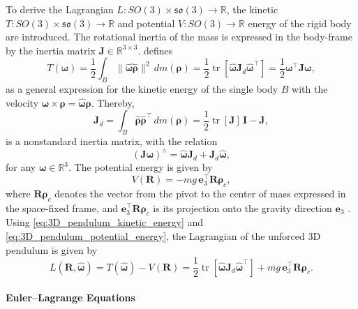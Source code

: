 To derive the Lagrangian $L:SO(3) \times\mathfrak{so}(3) \to \mathbb{R}$, the kinetic $T:SO(3) \times\mathfrak{so}(3) \to \mathbb{R} $ and potential $V:SO(3) \to \mathbb{R}$ energy of the rigid body are introduced. The rotational inertia of the mass is expressed in the body-frame by the inertia matrix $\bm{J} \in \mathbb{R}^{3 \times 3}$. \cite{Lee2008} defines 
\begin{equation}\label{eq:3D_pendulum_kinetic_energy}
T(\bm{\omega}) = \frac{1}{2} \int_{B} \lVert \hat{\bm{\omega} \bm{\rho}} \rVert^{2} \, dm(\bm{\rho})
= \frac{1}{2}\operatorname{tr}[\hat{\bm{\omega}} \bm{J}_d \hat{\bm{\omega}}^\top]
= \frac{1}{2} \bm{\omega}^\top \bm{J} \bm{\omega},
\end{equation}
as a general expression for the kinetic energy of the single body $B$ with the velocity $\bm{\omega} \times \bm{\rho} = \hat{\bm{\omega}}\bm{\rho}$. Thereby, 
\begin{equation}\label{eq:non-standard_inertia}
    \bm{J}_d = \int_{B} \hat{\bm{\rho}} \hat{\bm{\rho}}^\top  \, dm(\bm{\rho})
    =\frac{1}{2}\operatorname{tr}[\bm{J}]\,\bm{I}-\bm{J},
\end{equation}
is a nonstandard inertia matrix, with the relation
\begin{equation} \label{eq:nonstandard_Inertia_Relation}
    (\bm{J}\bm{\omega})^\wedge = \hat{\bm{\omega}}\bm{J}_d + \bm{J}_d \hat{\bm{\omega}},
\end{equation}
for any $\bm{\omega}\in\mathbb{R}^3$. The potential energy is given by
\begin{equation}\label{eq:3D_pendulum_potential_energy}
    V(\bm{R}) = -mg\, \bm{e}_3^\top \bm{R}\bm{\rho}_c,
\end{equation}
where \(\bm{R}\bm{\rho}_c\) denotes the vector from the pivot to the center of mass expressed in the space-fixed frame, and \(\bm{e}_3^\top \bm{R}\bm{\rho}_c\) is its projection onto the gravity direction \(\bm{e}_3\) \cite{Lee2008}. Using \eqref{eq:3D_pendulum_kinetic_energy} and \eqref{eq:3D_pendulum_potential_energy}, the Lagrangian of the unforced 3D pendulum is given by 
\begin{equation}\label{eq:continuous_3D_pendulum_lagrangian}
    L(\bm{R}, \hat{\bm{\omega}}) = T(\hat{\bm{\omega}}) - V(\bm{R})
    = \frac{1}{2}\operatorname{tr}[\hat{\bm{\omega}} \bm{J}_d \hat{\bm{\omega}}^\top] + mg\, \bm{e}_3^\top \bm{R}\bm{\rho}_c.
\end{equation}


\paragraph{Euler--Lagrange Equations}

